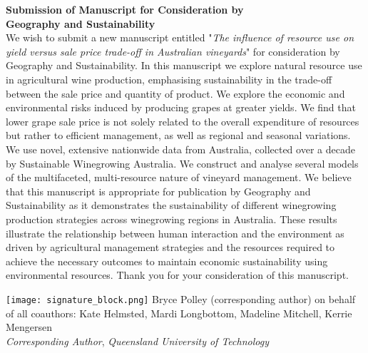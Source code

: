 \documentclass{article}
\begin{document}
\centering \textbf{Submission of Manuscript for Consideration by \\Geography and Sustainability}\\
\bigskip %
\justifying
\newline \noindent
We wish to submit a new manuscript entitled "\textit{The influence of resource use on yield versus sale price trade-off in Australian vineyards}" for consideration by Geography and Sustainability.
\newline \noindent
In this manuscript we explore natural resource use in agricultural wine production, emphasising sustainability in the trade-off between the sale price and quantity of product. We explore the economic and environmental risks induced by producing grapes at greater yields. We find that lower grape sale price is not solely related to the overall expenditure of resources but rather to efficient management, as well as regional and seasonal variations. We use novel, extensive nationwide data from Australia, collected over a decade by Sustainable Winegrowing Australia. We construct and analyse several models of the multifaceted, multi-resource nature of vineyard management. 
\newline \noindent
We believe that this manuscript is appropriate for publication by Geography and Sustainability as it demonstrates the sustainability of different winegrowing production strategies across winegrowing regions in Australia. These results illustrate the relationship between human interaction and the environment as driven by agricultural management strategies and the resources required to achieve the necessary outcomes to maintain economic sustainability using environmental resources. Thank you for your consideration of this manuscript.
\bigskip \noindent%

\texttt{[image: signature\_block.png]}
\newline \noindent
Bryce Polley (corresponding author) on behalf of all coauthors: Kate Helmsted, Mardi Longbottom, Madeline Mitchell, Kerrie Mengersen\\
\newline \noindent
\textit{Corresponding Author}, \textit{Queensland University of Technology}
\end{document}
